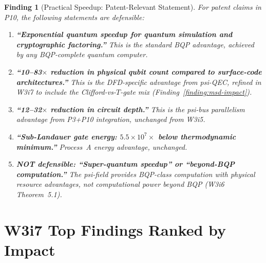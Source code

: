 \documentclass[11pt]{article}
\newtheorem{finding}[theorem]{Finding}
\theoremstyle{definition}
\theoremstyle{remark}
\newcommand{\ee}[1]{\times 10^{#1}}
\begin{document}
\begin{finding}[Practical Speedup: Patent-Relevant Statement]
\label{finding:patent-speedup}
For patent claims in P10, the following statements are defensible:

\begin{enumerate}
  \item \textbf{``Exponential quantum speedup for quantum simulation
    and cryptographic factoring.''} This is the standard BQP advantage,
    achieved by any BQP-complete quantum computer.

  \item \textbf{``10--83$\times$ reduction in physical qubit count
    compared to surface-code architectures.''} This is the DFD-specific
    advantage from psi-QEC, refined in W3i7 to include the
    Clifford-vs-$T$-gate mix (Finding~\ref{finding:msd-impact}).

  \item \textbf{``12--32$\times$ reduction in circuit depth.''} This
    is the psi-bus parallelism advantage from P3+P10 integration,
    unchanged from W3i5.

  \item \textbf{``Sub-Landauer gate energy: $5.5\ee{7}\times$ below
    thermodynamic minimum.''} Process~A energy advantage, unchanged.

  \item \textbf{NOT defensible: ``Super-quantum speedup'' or
    ``beyond-BQP computation.''} The psi-field provides BQP-class
    computation with physical resource advantages, not computational
    power beyond BQP (W3i6 Theorem~5.1).
\end{enumerate}
\end{finding}

\section{W3i7 Top Findings Ranked by Impact}
\label{sec:top-findings}
\end{document}
